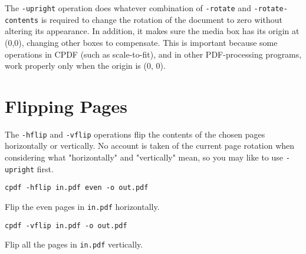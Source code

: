 \documentclass{book}
\begin{document}
  \label{upright}
   \noindent The \texttt{-upright} operation does whatever combination of
\texttt{-rotate} and \texttt{-rotate-contents} is required to change the
rotation of the document to zero without altering its appearance. In addition, it makes sure the media box has its origin at (0,0), changing other boxes to compensate. This is important because some operations in CPDF (such as scale-to-fit), and in other PDF-processing programs, work properly only when the origin is (0, 0).

  \section{Flipping Pages}
  The \texttt{-hflip} and \texttt{-vflip} operations flip the contents of the
chosen pages horizontally or vertically. No account is taken of the current
page rotation when considering what "horizontally" and "vertically" mean, so you may like to use \texttt{-upright} first.
  \begin{framed}
    \small\verb!cpdf -hflip in.pdf even -o out.pdf!

    \vspace{2.5mm}
    \noindent Flip the even pages in \texttt{in.pdf} horizontally.

    \vspace{2.5mm}
    \verb!cpdf -vflip in.pdf -o out.pdf!

    \vspace{2.5mm}
    \noindent Flip all the pages in \texttt{in.pdf} vertically.
  \end{framed}
\end{document}
